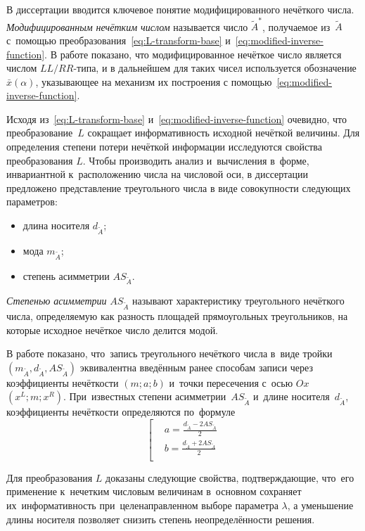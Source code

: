 В диссертации вводится ключевое понятие модифицированного нечёткого числа. \textit{Модифицированным нечётким числом} называется число $\tilde A^{*}$, получаемое из~$\tilde{A}$ с~помощью преобразования~\eqref{eq:L-transform-base} и~\eqref{eq:modified-inverse-function}. В работе показано, что модифицированное нечёткое число является числом $LL/RR$-типа, и в дальнейшем для таких чисел используется обозначение $\bar{x}\left( \alpha  \right)$, указывающее на механизм их построения с помощью~\eqref{eq:modified-inverse-function}.

Исходя из~\eqref{eq:L-transform-base} и~\eqref{eq:modified-inverse-function} очевидно, что преобразование~$L$ сокращает информативность исходной нечёткой величины. Для определения степени потери нечёткой информации исследуются свойства преобразования $L$. Чтобы производить анализ и~вычисления в~форме, инвариантной к~расположению числа на числовой оси, в диссертации предложено представление треугольного числа в виде совокупности следующих параметров:
\begin{itemize}
  \item длина носителя $d_{\tilde A}$;
  \item мода $m_{\tilde A}$;
  \item степень асимметрии $AS_{\tilde A}$.
\end{itemize}

\textit{Степенью асимметрии} $AS_{\tilde A}$ называют характеристику треугольного нечёткого числа, определяемую как разность площадей прямоугольных треугольников, на которые исходное нечёткое число делится модой.

В работе показано, что~запись треугольного нечёткого числа в~виде тройки $\left(m_{\tilde A}, d_{\tilde A}, AS_{\tilde A} \right)$ эквивалентна введённым ранее способам записи через коэффициенты нечёткости $\left( m;a;b \right)$ и~точки пересечения с~осью $Ox$ $\left( x^L;m;x^R \right)$. При~известных степени асимметрии~$AS_{\tilde A}$ и~длине носителя~$d_{\tilde A}$, коэффициенты нечёткости определяются по~формуле
\begin{equation*}
	\left[ \begin{aligned}
      & a=\frac{d_{\tilde A}-2AS_{\tilde A}}{2} \\ 
      & b=\frac{d_{\tilde A}+2AS_{\tilde A}}{2} \\ 
    \end{aligned} \right.
\end{equation*}

Для преобразования $L$ доказаны следующие свойства, подтверждающие, что~его применение к~нечетким числовым величинам в~основном сохраняет их~информативность при~целенаправленном выборе параметра $\lambda$, а уменьшение длины носителя позволяет снизить степень неопределённости решения.


